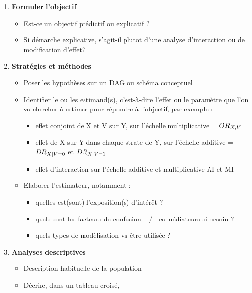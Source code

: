 \documentclass[
]{book}
\providecommand{\tightlist}{%
  \setlength{\itemsep}{0pt}\setlength{\parskip}{0pt}}
\begin{document}
\begin{enumerate}
\def\labelenumi{\arabic{enumi}.}
\tightlist
\item
  \textbf{Formuler l'objectif}

  \begin{itemize}
  \tightlist
  \item
    Est-ce un objectif prédictif ou explicatif ?
  \item
    Si démarche explicative, s'agit-il plutot d'une analyse d'interaction ou de modification d'effet?
  \end{itemize}
\item
  \textbf{Stratégies et méthodes}

  \begin{itemize}
  \tightlist
  \item
    Poser les hypothèses sur un DAG ou schéma conceptuel
  \item
    Identifier le ou les estimand(s), c'est-à-dire l'effet ou le paramètre que l'on va chercher à estimer pour répondre à l'objectif, par exemple :

    \begin{itemize}
    \tightlist
    \item
      effet conjoint de X et V sur Y, sur l'échelle multiplicative = \(\small OR_{X,V}\)
    \item
      effet de X sur Y dans chaque strate de Y, sur l'échelle additive = \(\small DR_{X|V=0}\) et \(\small DR_{X|V=1}\)
    \item
      effet d'interaction sur l'échelle additive et multiplicative AI et MI
    \end{itemize}
  \item
    Elaborer l'estimateur, notamment :

    \begin{itemize}
    \tightlist
    \item
      quelles est(sont) l'exposition(s) d'intérêt ?
    \item
      quels sont les facteurs de confusion +/- les médiateurs si besoin ?
    \item
      quels types de modèlisation va être utilisée ?
    \end{itemize}
  \end{itemize}
\item
  \textbf{Analyses descriptives}

  \begin{itemize}
  \tightlist
  \item
    Description habituelle de la population
  \item
    Décrire, dans un tableau croisé,


\end{itemize}
\end{enumerate}
\end{document}
